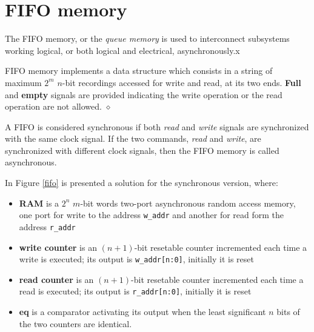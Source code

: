 \chapter{FIFO memory}\label{fifoMem}

\minitoc

The FIFO memory, or the {\em queue memory} is used to interconnect
subsystems working logical, or both logical and electrical,
asynchronously.x

\begin{definition}
FIFO memory implements a data structure which consists in a string
of maximum $2^{m}$ $n$-bit recordings accessed for write and read,
at its two ends. {\bf Full} and {\bf empty} signals are provided
indicating the write operation or the read operation are not
allowed. $\diamond$
\end{definition}


A FIFO is considered synchronous if both {\em read} and {\em
write} signals are synchronized with the same clock signal. If the
two commands, {\em read} and {\em write}, are synchronized with
different clock signals, then the FIFO memory is called
asynchronous.

In Figure \ref{fifo} is presented a solution for the synchronous
version, where:
\begin{itemize}
    \item {\bf RAM} is a $2^{n}$ $m$-bit words two-port asynchronous random access memory, one
    port for write to the address {\tt w\_addr} and another for
    read form the address {\tt r\_addr}
    \item {\bf write counter} is an $(n+1)$-bit resetable counter incremented
    each time a write is executed; its output is {\tt w\_addr[n:0]}, initially
    it is reset
    \item {\bf read counter} is an $(n+1)$-bit resetable counter incremented
    each time a read is executed; its output is {\tt r\_addr[n:0]}, initially it is reset
    \item {\bf eq} is a comparator activating its output when
    the least significant $n$ bits of the two counters are
    identical.
\end{itemize}

